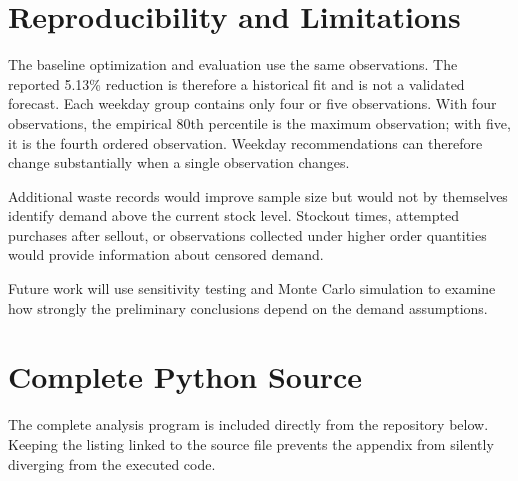 \documentclass[11pt]{article}
\begin{document}
\section{Reproducibility and Limitations}

The baseline optimization and evaluation use the same observations.  The
reported 5.13\% reduction is therefore a historical fit and is not a validated
forecast.  Each weekday group contains only four or five observations.  With
four observations, the empirical 80th percentile is the maximum observation;
with five, it is the fourth ordered observation.  Weekday recommendations can
therefore change substantially when a single observation changes.

Additional waste records would improve sample size but would not by themselves
identify demand above the current stock level.  Stockout times, attempted
purchases after sellout, or observations collected under higher order
quantities would provide information about censored demand.

Future work will use sensitivity testing and Monte Carlo simulation to examine
how strongly the preliminary conclusions depend on the demand assumptions.

\section{Complete Python Source}

The complete analysis program is included directly from the repository below.
Keeping the listing linked to the source file prevents the appendix from
silently diverging from the executed code.


\end{document}
